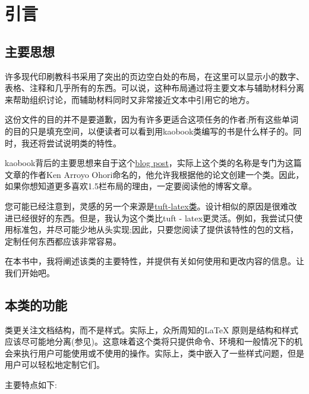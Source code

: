 \chapter{引言}

\section{主要思想}

许多现代印刷教科书采用了突出的页边空白处的布局，在这里可以显示小的数字、表格、注释和几乎所有的东西。可以说，这种布局通过将主要文本与辅助材料分离来帮助组织讨论，而辅助材料同时又非常接近文本中引用它的地方。

这份文件的目的并不是要道歉，因为有许多更适合这项任务的作者;所有这些单词的目的只是填充空间，以便读者可以看到用kaobook类编写的书是什么样子的。同时，我还将尝试说明类的特性。

kaobook背后的主要思想来自于这个\href{https://3d.bk.tudelft.nl/ken/en/2016/04/17/a-1.5-column-layout-in latex。html}{blog post}，实际上这个类的名称是专门为这篇文章的作者Ken Arroyo Ohori命名的，他允许我根据他的论文创建一个类。因此，如果你想知道更多喜欢1.5栏布局的理由，一定要阅读他的博客文章。

您可能已经注意到，灵感的另一个来源是\href{https://github.com/tuft-latex/tuft-latex}{tuft-latex类}。设计相似的原因是很难改进已经很好的东西。但是，我认为这个类比tuft - latex更灵活。例如，我尝试只使用标准包，并尽可能少地从头实现;因此，只要您阅读了提供该特性的包的文档，定制任何东西都应该非常容易。

在本书中，我将阐述该类的主要特性，并提供有关如何使用和更改内容的信息。让我们开始吧。

\section{本类的功能}

类更关注文档结构，而不是样式。实际上，众所周知的\LaTeX\xspace 原则是结构和样式应该尽可能地分离(参见)。这意味着这个类将只提供命令、环境和一般情况下的机会来执行用户可能使用或不使用的操作。实际上，类中嵌入了一些样式问题，但是用户可以轻松地定制它们。

主要特点如下:


